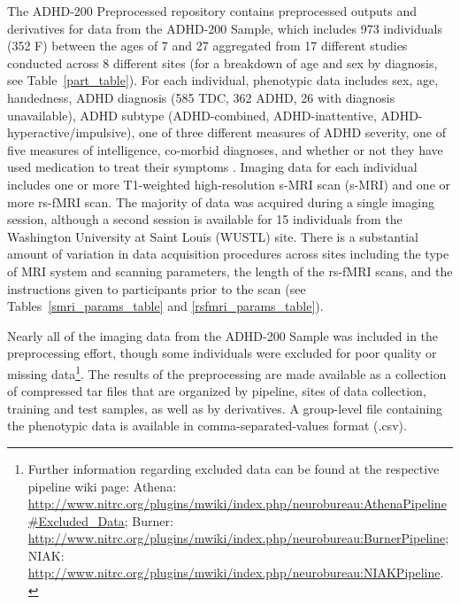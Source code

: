 \documentclass[preprint,12pt,3p]{elsarticle}
\begin{document}
The ADHD-200 Preprocessed repository contains preprocessed outputs and derivatives for data from the ADHD-200 Sample, which includes 973 individuals (352 F) between the ages of 7 and 27 aggregated from 17 different studies conducted across 8 different sites (for a breakdown of age and sex by diagnosis, see Table~\ref{part_table}). For each individual, phenotypic data includes sex, age, handedness, ADHD diagnosis (585 TDC, 362 ADHD, 26 with diagnosis unavailable), ADHD subtype (ADHD-combined, ADHD-inattentive, ADHD-hyperactive/impulsive), one of three different measures of ADHD severity, one of five measures of intelligence, co-morbid diagnoses, and whether or not they have used medication to treat their symptoms \cite{Milham2012}. Imaging data for each individual includes one or more T1-weighted high-resolution s-MRI scan (s-MRI) and one or more rs-fMRI scan. The majority of data was acquired during a single imaging session, although a second session is available for 15 individuals from the Washington University at Saint Louis (WUSTL) site. There is a substantial amount of variation in data acquisition procedures across sites including the type of MRI system and scanning parameters, the length of the rs-fMRI scans, and the instructions given to participants prior to the scan (see Tables~\ref{smri_params_table} and \ref{rsfmri_params_table}). 

Nearly all of the imaging data from the ADHD-200 Sample was included in the preprocessing effort, though some individuals were excluded for poor quality or missing data\footnote{Further information regarding excluded data can be found at the respective pipeline wiki page: Athena: \url{http://www.nitrc.org/plugins/mwiki/index.php/neurobureau:AthenaPipeline#Excluded_Data}; Burner: \url{http://www.nitrc.org/plugins/mwiki/index.php/neurobureau:BurnerPipeline}; NIAK: \url{http://www.nitrc.org/plugins/mwiki/index.php/neurobureau:NIAKPipeline}.}.
The results of the preprocessing are made available as a collection of compressed tar files that are organized by pipeline, sites of data collection, training and test samples, as well as by derivatives. A group-level file containing the phenotypic data is available in comma-separated-values format (.csv). 
\end{document}
